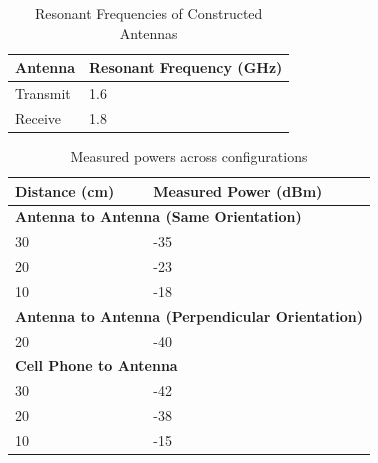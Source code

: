 \documentclass[journal]{IEEEtran}
\begin{document}
\begin{table}[hp]
    \centering
    \begin{tabular}{|l|l|}
        \toprule
        Antenna  & Resonant Frequency (GHz) \\ \midrule
        Transmit & 1.6                      \\ \midrule
        Receive  & 1.8                      \\ \bottomrule
    \end{tabular}
    \vspace{1em}
    \caption{\label{table:freq} Resonant Frequencies of Constructed Antennas}
\end{table}

\begin{table}[hp]
    \centering
    \begin{tabular}{ll}
        \toprule
        \multicolumn{1}{|l|}{Distance (cm)} & \multicolumn{1}{l|}{Measured Power (dBm)} \\ \midrule
        \multicolumn{2}{|l|}{\textbf{Antenna to Antenna (Same Orientation)}}            \\ \midrule
        \multicolumn{1}{|l|}{30}            & \multicolumn{1}{l|}{-35}                  \\ \midrule
        \multicolumn{1}{|l|}{20}            & \multicolumn{1}{l|}{-23}                  \\ \midrule
        \multicolumn{1}{|l|}{10}            & \multicolumn{1}{l|}{-18}                  \\ \midrule
        \multicolumn{2}{|l|}{\textbf{Antenna to Antenna (Perpendicular Orientation)}}   \\ \midrule
        \multicolumn{1}{|l|}{20}            & \multicolumn{1}{l|}{-40}                  \\ \midrule
        \multicolumn{2}{|l|}{\textbf{Cell Phone to Antenna}}                            \\ \midrule
        \multicolumn{1}{|l|}{30}            & \multicolumn{1}{l|}{-42}                  \\ \midrule
        \multicolumn{1}{|l|}{20}            & \multicolumn{1}{l|}{-38}                  \\ \midrule
        \multicolumn{1}{|l|}{10}            & \multicolumn{1}{l|}{-15}                  \\ \bottomrule
    \end{tabular}

    \vspace{1em}
    \caption{\label{table:power} Measured powers across configurations}
\end{table}
\end{document}
